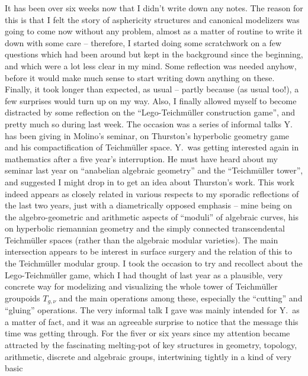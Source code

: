 \label{sec:68}%
It has been over six weeks now that I didn't write down any notes. The
reason for this is that I felt the story of asphericity structures and
canonical modelizers was going to come now without any problem, almost
as a matter of routine to write it down with some care -- therefore, I
started doing some scratchwork on a few questions which had been
around but kept in the background since the beginning, and which were
a lot less clear in my mind. Some reflection was needed anyhow, before
it would make much sense to start writing down anything on
these. Finally, it took longer than expected, as usual -- partly
because (as usual too!), a few surprises would turn up on my
way. Also, I finally allowed myself to become distracted by some
reflection on the ``Lego-Teichmüller construction game'', and pretty
much so during last week. The occasion was a series of informal talks
Y. has been giving in Molino's seminar,
on Thurston's hyperbolic geometry game and his compactification of
Teichm\"uller space. Y.\ was getting interested again in mathematics
after a five year's interruption. He must have heard about my seminar
last year on ``anabelian algebraic geometry'' and the ``Teichmüller
tower'', and suggested I might drop in to get an idea about Thurston's
work. This work indeed appears as closely related in various respects
to my sporadic reflections of the last two years, just with a
diametrically opposed emphasis -- mine being on the algebro-geometric
and arithmetic aspects of ``moduli'' of algebraic curves, his on
hyperbolic riemannian geometry and the simply connected transcendental
Teichmüller spaces (rather than the algebraic modular
varieties). The main intersection appears to be interest in surface
surgery and the relation of this to the Teichmüller modular group. I
took the occasion to try and recollect about the Lego-Teichmüller
game, which I had thought of last year as a plausible, very concrete
way for modelizing and visualizing the whole tower of Teichmüller
groupoids $T_{g,\nu}$ and the main operations among these, especially
the ``cutting'' and ``gluing'' operations. The very informal talk I
gave was mainly intended for Y.\ as a matter of fact, and
it was an agreeable surprise to notice that the message
this time was getting through. For the fiver or six years since my
attention became attracted by the fascinating melting-pot of key
structures in geometry, topology, arithmetic, discrete and algebraic
groups, intertwining tightly in a kind of very basic
